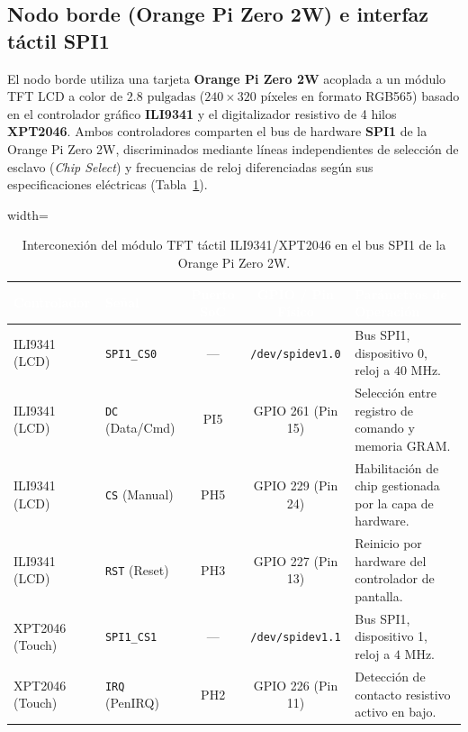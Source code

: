 \documentclass[12pt, letterpaper]{article}
\begin{document}
\subsection*{Nodo borde (Orange Pi Zero 2W) e interfaz táctil SPI1}

El nodo borde utiliza una tarjeta \textbf{Orange Pi Zero 2W} acoplada a un módulo TFT LCD a color de $2.8\text{ pulgadas}$ ($240 \times 320$ píxeles en formato RGB565) basado en el controlador gráfico \textbf{ILI9341} y el digitalizador resistivo de 4 hilos \textbf{XPT2046}. Ambos controladores comparten el bus de hardware \textbf{SPI1} de la Orange Pi Zero 2W, discriminados mediante líneas independientes de selección de esclavo (\textit{Chip Select}) y frecuencias de reloj diferenciadas según sus especificaciones eléctricas (Tabla~\ref{tab:pinout_opi}).

\begin{table}[H]
    \centering
    \renewcommand{\arraystretch}{1.5}
    \small
    \caption{Interconexión del módulo TFT táctil ILI9341/XPT2046 en el bus SPI1 de la Orange Pi Zero 2W.}
    \label{tab:pinout_opi}
    \begin{adjustbox}{width=\textwidth}
    \begin{tabular}{|l|l|c|c|m{5cm}|}
        \hline
        \rowcolor{MidnightBlue!80}
        \textcolor{white}{\textbf{Controlador}} & \textcolor{white}{\textbf{Señal}}& \textcolor{white}{\textbf{Puerto SoC}} & \textcolor{white}{\textbf{GPIO / Pin Físico}} & \textcolor{white}{\textbf{Parámetros de Operación}} \\
        \hline
        ILI9341 (LCD) & \texttt{SPI1\_CS0} & --- & \texttt{/dev/spidev1.0} & Bus SPI1, dispositivo 0, reloj a $40\text{ MHz}$. \\
        \hline
        ILI9341 (LCD) & \texttt{DC} (Data/Cmd) & PI5 & GPIO 261 (Pin 15) & Selección entre registro de comando y memoria GRAM. \\
        \hline
        ILI9341 (LCD) & \texttt{CS} (Manual) & PH5 & GPIO 229 (Pin 24) & Habilitación de chip gestionada por la capa de hardware. \\
        \hline
        ILI9341 (LCD) & \texttt{RST} (Reset) & PH3 & GPIO 227 (Pin 13) & Reinicio por hardware del controlador de pantalla. \\
        \hline
        XPT2046 (Touch) & \texttt{SPI1\_CS1} & --- & \texttt{/dev/spidev1.1} & Bus SPI1, dispositivo 1, reloj a $4\text{ MHz}$. \\
        \hline
        XPT2046 (Touch) & \texttt{IRQ} (PenIRQ) & PH2 & GPIO 226 (Pin 11) & Detección de contacto resistivo activo en bajo. \\
        \hline
    \end{tabular}
    \end{adjustbox}
\end{table}
\end{document}
